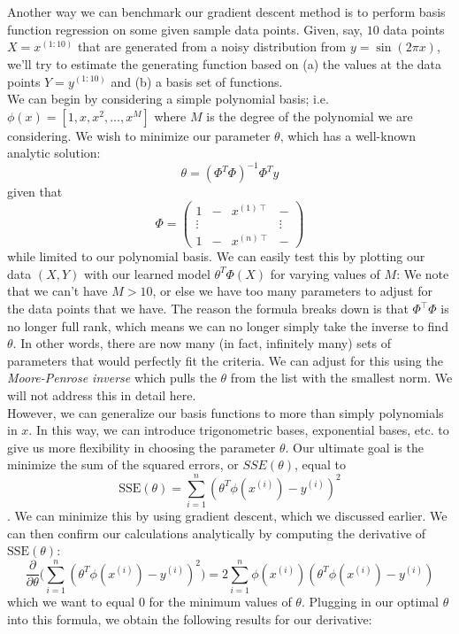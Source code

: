 \documentclass[11pt,letterpaper]{article}
\begin{document}
\section{}
Another way we can benchmark our gradient descent method is to perform basis function regression on some given sample data points. Given, say, $10$ data points $X = x^{(1:10)}$ that are generated from a noisy distribution from $y = \sin(2\pi x)$, we'll try to estimate the generating function based on (a) the values at the data points $Y = y^{(1:10)}$ and (b) a basis set of functions.\\
We can begin by considering a simple polynomial basis; i.e. $\phi(x) = [1, x, x^2, \ldots , x^M]$ where $M$ is the degree of the polynomial we are considering. We wish to minimize our parameter $\theta$, which has a well-known analytic solution:
$$\theta = (\Phi^T\Phi)^{-1}\Phi^Ty$$
given that
$$\Phi = \left( \begin{array}{cccc}
1 & - & x^{(1)\intercal} & - \\
\vdots &  & & \vdots \\
1 & - & x^{(n)\intercal} & - \end{array} \right) $$
while limited to our polynomial basis. We can easily test this by plotting our data $(X, Y)$ with our learned model $\theta^T\Phi(X)$ for varying values of $M$:
We note that we can't have $M > 10$, or else we have too many parameters to adjust for the data points that we have. The reason the formula breaks down is that $\Phi^\intercal\Phi$ is no longer full rank, which means we can no longer simply take the inverse to find $\theta$. In other words, there are now many (in fact, infinitely many) sets of parameters that would perfectly fit the criteria. We can adjust for this using the \textit{Moore-Penrose inverse} which pulls the $\theta$ from the list with the smallest norm. We will not address this in detail here.\\
However, we can generalize our basis functions to more than simply polynomials in $x$. In this way, we can introduce trigonometric bases, exponential bases, etc. to give us more flexibility in choosing the parameter $\theta$. Our ultimate goal is the minimize the sum of the squared errors, or $SSE(\theta)$, equal to
$$\text{SSE}(\theta) = \sum_{i=1}^n (\theta^T\phi(x^{(i)}) - y^{(i)})^2$$.
We can minimize this by using gradient descent, which we discussed earlier. We can then confirm our calculations analytically by computing the derivative of $\text{SSE}(\theta)$:
$$\frac{\partial}{\partial\theta}\Big(\sum_{i=1}^n (\theta^T\phi(x^{(i)}) - y^{(i)})^2\Big) = 2\sum_{i=1}^n \phi(x^{(i)})(\theta^T\phi(x^{(i)}) - y^{(i)})$$
which we want to equal $0$ for the minimum values of $\theta$. Plugging in our optimal $\theta$ into this formula, we obtain the following results for our derivative:
\end{document}
